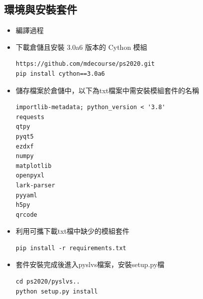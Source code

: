 \documentclass[14pt,a4paper]{report}  %
\newcommand{\fourteen}{\fontsize{14pt}{\baselineskip}\selectfont}%
\begin{document}
{\subsection{環境與安裝套件}
		\begin{itemize}		
		\item{編譯過程}\\     
		\fourteen {下載已經建立開發環境的套件(如:Mysy2程式、python38、solvespace)的可攜kmol-project檔案，之後安裝3.0a6版本的Cython模組以便進行Pyslvs編譯，另外安裝環境缺少的套件(如: PyQt、Numpy)，完成開發環境的架構後下載ps2020檔案，進入ps2020中在Makefile中進行編譯，完成後進入ps2020中Pyslvs檔案夾安裝setup.py檔，此動作主要壓縮並包裝檔案於資料夾中，最後回到ps2020根目錄再次安裝下載setup.py為使整個環境、編譯動態連結庫封裝成Pyslvs.exe執行檔，最後只需打Pyslvs即可呼叫啟動位於資料夾中的Pyslvs.exe執行檔，出現在畫面中的頁面為編譯完成後的結果。} 

		\item 下載倉儲且安裝 3.0a6 版本的 Cython 模組
		\begin{lstlisting}[caption=下載倉儲安裝Cython]
https://github.com/mdecourse/ps2020.git
pip install cython==3.0a6
		\end{lstlisting}
		\end{itemize}

		\begin{itemize}
		\item 儲存檔案於倉儲中，以下為txt檔案中需安裝模組套件的名稱
		\begin{lstlisting}[caption=安裝模組套件]
importlib-metadata; python_version < '3.8'
requests
qtpy
pyqt5
ezdxf
numpy
matplotlib
openpyxl
lark-parser
pyyaml
h5py
qrcode
		\end{lstlisting}
		\end{itemize}
		
		\newpage
		\begin{itemize}
		\item 利用可攜下載txt檔中缺少的模組套件
		\begin{lstlisting}[caption=安裝模組套件指令]
pip install -r requirements.txt
		\end{lstlisting}
		\end{itemize}
		
		\begin{itemize}
		\item 套件安裝完成後進入pyslvs檔案，安裝setup.py檔
		\begin{lstlisting}[caption=安裝步驟]
cd ps2020/pyslvs..
python setup.py install
		\end{lstlisting}
		\end{itemize}
		
}
\end{document}

